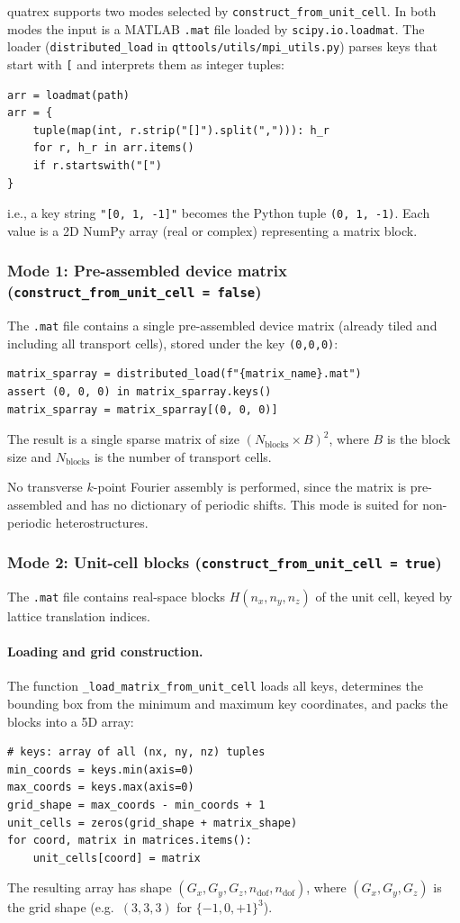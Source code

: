 quatrex supports two modes selected by
\texttt{construct\_from\_unit\_cell}.  In both modes the input is a
MATLAB \texttt{.mat} file loaded by \texttt{scipy.io.loadmat}.  The
loader (\texttt{distributed\_load} in
\texttt{qttools/utils/mpi\_utils.py}) parses keys that start with
\texttt{[} and interprets them as integer tuples:
\begin{lstlisting}
arr = loadmat(path)
arr = {
    tuple(map(int, r.strip("[]").split(","))): h_r
    for r, h_r in arr.items()
    if r.startswith("[")
}
\end{lstlisting}
i.e., a key string \texttt{"[0, 1, -1]"} becomes the Python
tuple \texttt{(0, 1, -1)}.  Each value is a 2D NumPy array (real or
complex) representing a matrix block.

\subsubsection{Mode 1: Pre-assembled device matrix
  (\texttt{construct\_from\_unit\_cell = false})}

The \texttt{.mat} file contains a single pre-assembled device matrix
(already tiled and including all transport cells), stored under the
key \texttt{(0,0,0)}:
\begin{lstlisting}
matrix_sparray = distributed_load(f"{matrix_name}.mat")
assert (0, 0, 0) in matrix_sparray.keys()
matrix_sparray = matrix_sparray[(0, 0, 0)]
\end{lstlisting}
The result is a single sparse matrix of size
$(N_\mathrm{blocks} \times B)^2$, where $B$ is the block size and
$N_\mathrm{blocks}$ is the number of transport cells.

No transverse $k$-point Fourier assembly is performed, since
the matrix is pre-assembled and has no dictionary of periodic shifts.
This mode is suited for non-periodic heterostructures.

\subsubsection{Mode 2: Unit-cell blocks
  (\texttt{construct\_from\_unit\_cell = true})}
\label{sec:mode2}

The \texttt{.mat} file contains real-space blocks $H(n_x, n_y, n_z)$
of the unit cell, keyed by lattice translation indices.

\paragraph{Loading and grid construction.}
The function \texttt{\_load\_matrix\_from\_unit\_cell} loads all keys,
determines the bounding box from the minimum and maximum key
coordinates, and packs the blocks into a 5D array:
\begin{lstlisting}
# keys: array of all (nx, ny, nz) tuples
min_coords = keys.min(axis=0)
max_coords = keys.max(axis=0)
grid_shape = max_coords - min_coords + 1
unit_cells = zeros(grid_shape + matrix_shape)
for coord, matrix in matrices.items():
    unit_cells[coord] = matrix
\end{lstlisting}
The resulting array has shape
$(G_x, G_y, G_z, n_\mathrm{dof}, n_\mathrm{dof})$, where
$(G_x, G_y, G_z)$ is the grid shape (e.g.\ $(3, 3, 3)$ for
$\{-1,0,+1\}^3$).

